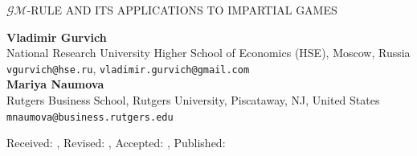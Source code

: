 \documentclass[10pt]{article}
\theoremstyle{definition}
\begin{document}
\begin{center}
\uppercase{$\mathcal{GM}$-rule and its applications to impartial games}

\vskip 20pt
{\bf Vladimir Gurvich}\\
{\smallit National Research University Higher School of Economics (HSE), Moscow, Russia}\\
{\tt vgurvich@hse.ru}, {\tt vladimir.gurvich@gmail.com}\\
\vskip 10pt
{\bf Mariya Naumova}\\
{\smallit Rutgers Business School, Rutgers University, Piscataway, NJ, United States}\\
{\tt mnaumova@business.rutgers.edu}\\
\end{center}
\vskip 20pt
\centerline{\smallit Received: , Revised: , Accepted: , Published: } 
\vskip 30pt
\end{document}
